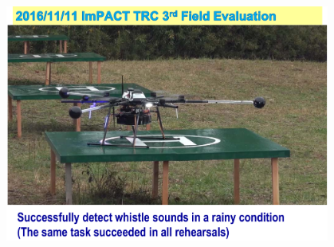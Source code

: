 \documentclass[xetex,mathserif,serif]{beamer}
\begin{document}
	\begin{frame}
		\begin{center}
			\includegraphics[width=0.8\textwidth]{okuno23.png}
		\end{center}
	\end{frame}
\end{document}
